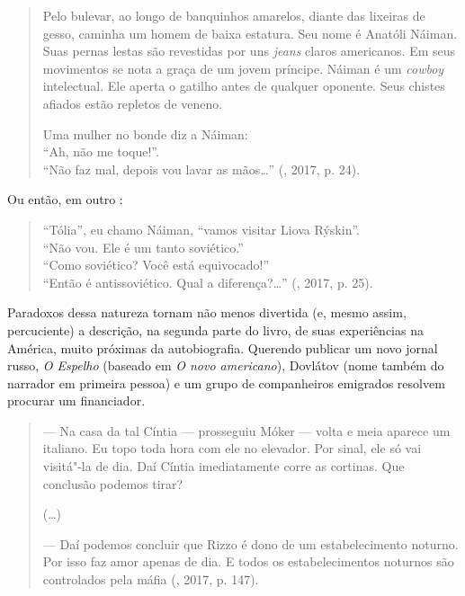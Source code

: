 \begin{quotation}
Pelo bulevar, ao longo de banquinhos amarelos, diante das lixeiras de
gesso, caminha um homem de baixa estatura. Seu nome é Anatóli Náiman.
Suas pernas lestas são revestidas por uns \emph{jeans} claros americanos. Em seus
movimentos se nota a graça de um jovem príncipe. Náiman é um \emph{cowboy}
intelectual. Ele aperta o gatilho antes de qualquer oponente. Seus 
chistes afiados estão repletos de veneno.\\



\noindent{}Uma mulher no bonde diz a Náiman: \\
``Ah, não me toque!''. \\
``Não faz mal, depois vou lavar as mãos\ldots{}'' (, 2017, p. 24).

\end{quotation}

Ou então, em outro :

\begin{quotation}
\noindent{}``Tólia'', eu chamo Náiman, ``vamos visitar Liova Rýskin''. \\
``Não vou. Ele é um  tanto soviético.'' \\
``Como soviético? Você está equivocado!'' \\
``Então é antissoviético. Qual a diferença?\ldots{}'' (, 2017, p. 25).

\end{quotation}

Paradoxos dessa natureza tornam não menos divertida (e, mesmo assim,
 percuciente) a descrição, na segunda parte do livro, de suas 
experiências na América, muito próximas da autobiografia. Querendo
publicar um novo jornal russo, \emph{O Espelho} (baseado em \emph{O novo
 americano}), Dovlátov (nome também do narrador em primeira pessoa) e um grupo de
companheiros emigrados resolvem procurar um financiador.

\begin{quotation}
--- Na casa da tal Cíntia --- prosseguiu Móker --- volta e meia aparece um italiano. Eu topo toda hora com ele no elevador. Por sinal, ele só vai visitá"-la de dia. Daí Cíntia imediatamente corre as cortinas. Que conclusão podemos tirar?

(\ldots{})

--- Daí podemos concluir que Rizzo é dono de um estabelecimento noturno. Por isso faz amor apenas de dia. E todos os estabelecimentos noturnos são controlados pela máfia (, 2017, p. 147).
\end{quotation}

